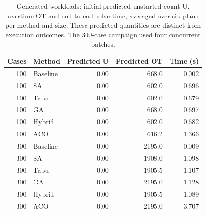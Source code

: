 \begin{table}[H]
\centering\small
\caption{Generated workloads: initial predicted unstarted count U, overtime OT and end-to-end solve time, averaged over six plans per method and size. These predicted quantities are distinct from execution outcomes. The 300-case campaign used four concurrent batches.}
\label{tab:room-initial}
\begin{tabular}{@{}rlrrr@{}}
\toprule
Cases & Method & Predicted U & Predicted OT & Time (s) \\
\midrule
100 & Baseline & 0.00 & 668.0 & 0.002 \\
100 & SA & 0.00 & 602.0 & 0.696 \\
100 & Tabu & 0.00 & 602.0 & 0.679 \\
100 & GA & 0.00 & 668.0 & 0.697 \\
100 & Hybrid & 0.00 & 602.0 & 0.682 \\
100 & ACO & 0.00 & 616.2 & 1.366 \\
300 & Baseline & 0.00 & 2195.0 & 0.009 \\
300 & SA & 0.00 & 1908.0 & 1.098 \\
300 & Tabu & 0.00 & 1905.5 & 1.107 \\
300 & GA & 0.00 & 2195.0 & 1.128 \\
300 & Hybrid & 0.00 & 1905.5 & 1.089 \\
300 & ACO & 0.00 & 2195.0 & 3.707 \\
\bottomrule
\end{tabular}
\end{table}
